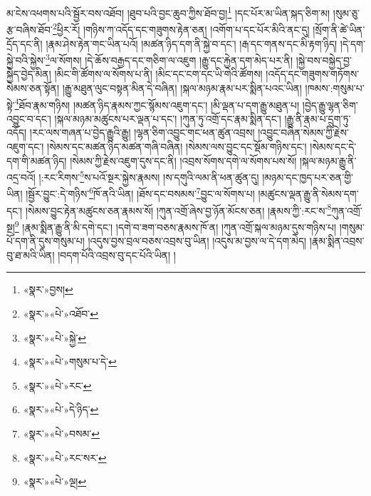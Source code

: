 མ་ངེས་འཕགས་པའི་སྦྱོར་བས་འཐོབ། །ཐུབ་པའི་བྱང་ཆུབ་ཀྱིས་ཐོབ་བྱ།\footnote{«སྣར་»བྱས།} །དང་པོར་མ་ཡིན་སྐད་ཅིག་མ། །སུམ་ཅུ་རྩ་བཞིས་ཐོབ་\footnote{«སྣར་»«པེ་»འཐོབ་}ཕྱིར་རོ། །གཉིས་ཀ་འདོད་དང་གཟུགས་རྟེན་ཅན། །འགོག་པ་དང་པོར་མིའི་ནང་དུ། །སྲོག་ནི་ཚེ་ཡིན་དྲོད་དང་ནི། །རྣམ་ཤེས་རྟེན་གང་ཡིན་པའོ། །མཚན་ཉིད་དག་ནི་སྐྱེ་བ་དང་། །རྒ་དང་གནས་དང་མི་རྟག་ཉིད། །དེ་དག་སྐྱེ་བའི་སྐྱེས་\footnote{«སྣར་»«པེ་»སྐྱེ་}ལ་སོགས། །དེ་ཆོས་བརྒྱད་དང་གཅིག་ལ་འཇུག །རྒྱུ་དང་རྐྱེན་དག་མེད་པར་ནི། །སྐྱེ་བས་བསྐྱེད་བྱ་སྐྱེད་བྱེད་མིན། །མིང་གི་ཚོགས་ལ་སོགས་པ་ནི། །མིང་དང་ངག་དང་ཡི་གེའི་ཚོགས། །འདོད་དང་གཟུགས་གཏོགས་སེམས་ཅན་སྟོན། །རྒྱུ་མཐུན་ལུང་བསྟན་མིན་དེ་བཞིན། །སྐལ་མཉམ་རྣམ་པར་སྨིན་པའང་ཡིན། །ཁམས་:གསུམ་པ་སྟེ་\footnote{«སྣར་»«པེ་»གསུམ་པ་དེ་}ཐོབ་རྣམ་གཉིས། །མཚན་ཉིད་རྣམས་ཀྱང་སྙོམས་འཇུག་དང་། །མི་ལྡན་པ་དག་རྒྱུ་མཐུན་པ། །བྱེད་རྒྱུ་ལྷན་ཅིག་འབྱུང་བ་དང་། །སྐལ་མཉམ་མཚུངས་པར་ལྡན་པ་དང་། །ཀུན་ཏུ་འགྲོ་དང་རྣམ་སྨིན་དང་། །རྒྱུ་ནི་རྣམ་པ་དྲུག་ཏུ་འདོད། །རང་ལས་གཞན་པ་བྱེད་རྒྱུའི་རྒྱུ། །ལྷན་ཅིག་འབྱུང་གང་ཕན་ཚུན་འབྲས། །འབྱུང་བཞིན་སེམས་ཀྱི་རྗེས་འཇུག་དང་། །སེམས་དང་མཚན་ཉིད་མཚན་གཞི་བཞིན། །སེམས་ལས་བྱུང་དང་སྡོམ་གཉིས་དང་། །སེམས་དང་དེ་དག་གི་མཚན་ཉིད། །སེམས་ཀྱི་རྗེས་འཇུག་དུས་དང་ནི། །འབྲས་སོགས་དགེ་ལ་སོགས་པས་སོ། །སྐལ་མཉམ་རྒྱུ་ནི་འདྲ་བའོ། །:རང་རིགས་\footnote{«སྣར་»«པེ་»རང་}ས་པའོ་སྔར་སྐྱེས་རྣམས། །ས་དགུའི་ལམ་ནི་ཕན་ཚུན་དུ། །མཉམ་དང་ཁྱད་པར་ཅན་གྱི་ཡིན། །སྦྱོར་བྱུང་:དེ་གཉིས་\footnote{«སྣར་»«པེ་»དེ་ཉིད་}ཁོ་ནའི་ཡིན། །ཐོས་དང་བསམས་\footnote{«སྣར་»«པེ་»བསམ་}བྱུང་ལ་སོགས་པ། །མཚུངས་ལྡན་རྒྱུ་ནི་སེམས་དག་དང་། །སེམས་བྱུང་རྟེན་མཚུངས་ཅན་རྣམས་སོ། །ཀུན་འགྲོ་ཞེས་བྱ་ཉོན་མོངས་ཅན། །རྣམས་ཀྱི་:རང་ས་\footnote{«སྣར་»«པེ་»རང་སར་}ཀུན་འགྲོ་སྔ།\footnote{«སྣར་»«པེ་»ལྔ།} །རྣམ་སྨིན་རྒྱུ་ནི་མི་དགེ་དང་། །དགེ་བ་ཟག་བཅས་རྣམས་ཁོ་ན། །ཀུན་འགྲོ་སྐལ་མཉམ་དུས་གཉིས་པ། །གསུམ་པོ་དག་ནི་དུས་གསུམ་པ། །འདུས་བྱས་བྲལ་བཅས་འབྲས་བུ་ཡིན། །འདུས་མ་བྱས་ལ་དེ་དག་མེད། །རྣམ་སྨིན་འབྲས་བུ་ཐ་མའི་ཡིན། །བདག་པོའི་འབྲས་བུ་དང་པོའི་ཡིན། །
